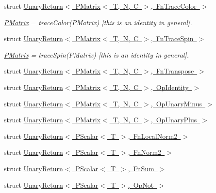 \begin{DoxyCompactItemize}
struct \mbox{\hyperlink{structENSEM_1_1UnaryReturn_3_01PMatrix_3_01T_00_01N_00_01C_01_4_00_01FnTraceColor_01_4}{Unary\+Return$<$ P\+Matrix$<$ T, N, C $>$, Fn\+Trace\+Color $>$}}
\begin{DoxyCompactList}\small\item\em \mbox{\hyperlink{classENSEM_1_1PMatrix}{P\+Matrix}} = trace\+Color(\+P\+Matrix) \mbox{[}this is an identity in general\mbox{]}. \end{DoxyCompactList}\item 
struct \mbox{\hyperlink{structENSEM_1_1UnaryReturn_3_01PMatrix_3_01T_00_01N_00_01C_01_4_00_01FnTraceSpin_01_4}{Unary\+Return$<$ P\+Matrix$<$ T, N, C $>$, Fn\+Trace\+Spin $>$}}
\begin{DoxyCompactList}\small\item\em \mbox{\hyperlink{classENSEM_1_1PMatrix}{P\+Matrix}} = trace\+Spin(\+P\+Matrix) \mbox{[}this is an identity in general\mbox{]}. \end{DoxyCompactList}\item 
struct \mbox{\hyperlink{structENSEM_1_1UnaryReturn_3_01PMatrix_3_01T_00_01N_00_01C_01_4_00_01FnTranspose_01_4}{Unary\+Return$<$ P\+Matrix$<$ T, N, C $>$, Fn\+Transpose $>$}}
\item 
struct \mbox{\hyperlink{structENSEM_1_1UnaryReturn_3_01PMatrix_3_01T_00_01N_00_01C_01_4_00_01OpIdentity_01_4}{Unary\+Return$<$ P\+Matrix$<$ T, N, C $>$, Op\+Identity $>$}}
\item 
struct \mbox{\hyperlink{structENSEM_1_1UnaryReturn_3_01PMatrix_3_01T_00_01N_00_01C_01_4_00_01OpUnaryMinus_01_4}{Unary\+Return$<$ P\+Matrix$<$ T, N, C $>$, Op\+Unary\+Minus $>$}}
\item 
struct \mbox{\hyperlink{structENSEM_1_1UnaryReturn_3_01PMatrix_3_01T_00_01N_00_01C_01_4_00_01OpUnaryPlus_01_4}{Unary\+Return$<$ P\+Matrix$<$ T, N, C $>$, Op\+Unary\+Plus $>$}}
\item 
struct \mbox{\hyperlink{structENSEM_1_1UnaryReturn_3_01PScalar_3_01T_01_4_00_01FnLocalNorm2_01_4}{Unary\+Return$<$ P\+Scalar$<$ T $>$, Fn\+Local\+Norm2 $>$}}
\item 
struct \mbox{\hyperlink{structENSEM_1_1UnaryReturn_3_01PScalar_3_01T_01_4_00_01FnNorm2_01_4}{Unary\+Return$<$ P\+Scalar$<$ T $>$, Fn\+Norm2 $>$}}
\item 
struct \mbox{\hyperlink{structENSEM_1_1UnaryReturn_3_01PScalar_3_01T_01_4_00_01FnSum_01_4}{Unary\+Return$<$ P\+Scalar$<$ T $>$, Fn\+Sum $>$}}
\item 
struct \mbox{\hyperlink{structENSEM_1_1UnaryReturn_3_01PScalar_3_01T_01_4_00_01OpNot_01_4}{Unary\+Return$<$ P\+Scalar$<$ T $>$, Op\+Not $>$}}

\end{DoxyCompactItemize}
